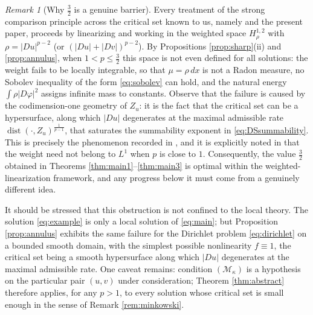 \documentclass[reqno]{amsart}
\theoremstyle{plain}
\theoremstyle{definition}
\theoremstyle{remark}
\newtheorem{remark}[theorem]{Remark}
\newcommand{\dist}{\operatorname{dist}}
\begin{document}
\begin{remark}[Why $\frac32$ is a genuine barrier]\label{rem:barrier}
Every treatment of the strong comparison principle across the critical set known to us, namely
\cite{DS2,Sci2,MMS,Mon,Le} and the present paper, proceeds by linearizing and working in the
weighted space $H^{1,2}_{\rho}$ with $\rho=|Du|^{p-2}$ (or $(|Du|+|Dv|)^{p-2}$). By Propositions
\ref{prop:sharp}(ii) and \ref{prop:annulus}, when $1<p\le\frac32$ this space is not even defined for
all solutions: the
weight fails to be locally integrable, so that $\mu=\rho\,dx$ is not a Radon measure, no Sobolev
inequality of the form \eqref{eq:sobolev} can hold, and the natural energy
$\int\rho|D\varphi|^2$ assigns infinite mass to constants. Observe that the failure is caused by the
codimension-one geometry of $Z_u$: it is the fact that the critical set can be a hypersurface, along
which $|Du|$ degenerates at the maximal admissible rate $\dist(\cdot,Z_u)^{\frac1{p-1}}$, that
saturates the summability exponent in \eqref{eq:DSsummability}. This is precisely the phenomenon
recorded in \cite[Example 5.2]{Sci2}, and it is explicitly noted in \cite{MMS} that
the weight need not belong to $L^1$ when $p$ is close to $1$. Consequently, the value
$\frac32$ obtained in Theorems \ref{thm:main1}--\ref{thm:main3} is optimal within the
weighted-linearization framework, and any progress below it must come from a genuinely different
idea.

It should be stressed that this obstruction is not confined to the local theory. The solution
\eqref{eq:example} is only a local solution of \eqref{eq:main}; but Proposition \ref{prop:annulus}
exhibits the same failure for the Dirichlet problem \eqref{eq:dirichlet} on a bounded smooth
domain, with the simplest possible nonlinearity $f\equiv1$, the critical set being a smooth
hypersurface along which $|Du|$ degenerates at the maximal admissible rate. One caveat remains:
condition $(\mathcal M_\kappa)$ is a
hypothesis on the particular pair $(u,v)$ under consideration; Theorem \ref{thm:abstract} therefore
applies, for any $p>1$, to every solution whose critical set is small enough in the sense of Remark
\ref{rem:minkowski}.
\end{remark}
\end{document}
